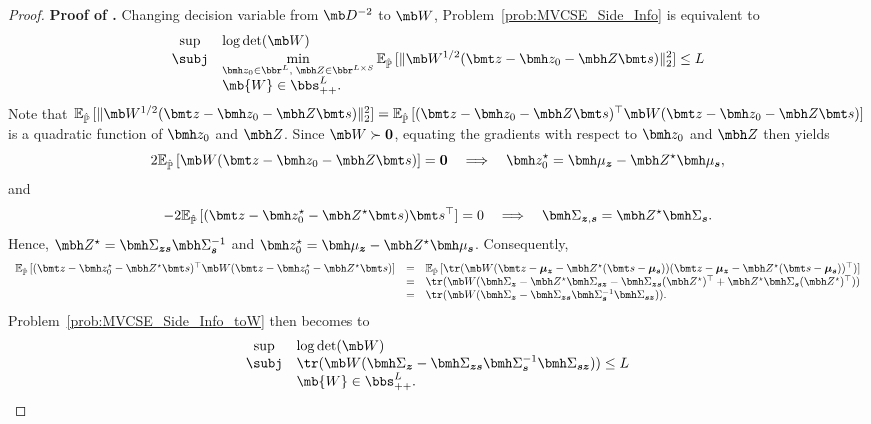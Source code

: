 \documentclass[mnsc, nonblindrev]{informswp}
\newcommand{\1}[1]{\mathds{1}{\left(#1\right)}}
\begin{document}
\begin{appendices}
\begin{proof}{\bf Proof of .}
Changing decision variable from $\mb D^{-2} $ to $\mb W$, Problem~\eqref{prob:MVCSE_Side_Info} is equivalent to
\begin{equation}
\label{prob:MVCSE_Side_Info_toW}
\begin{array}{cll}
\sup & \log\det(\mb W) \\
\subj & \displaystyle \min_{\bmh z_0\in \bbr^L, \; \mbh Z\in \bbr^{L \times S}} \mathbb{E}_{\hat{\mathbb{P}}}\,[\|\mb W^{1/2} ( \bmt z - \bmh z_0- \mbh Z\bmt s )\|_2^2] \leq L \\
& \mb{W} \in \bbs^{L}_{++}.  
\end{array} 
\end{equation}
Note that
$\mathbb{E}_{\hat{\mathbb{P}}}\,[\|\mb W^{1/2} ( \bmt z - \bmh z_0- \mbh Z\bmt s )\|_2^2] = \mathbb{E}_{\hat{\mathbb{P}}}\,[(\bmt z - \bmh z_0- \mbh Z\bmt s )^\top  \mb W (\bmt z - \bmh z_0- \mbh Z\bmt s)]$ is a quadratic function of $\bmh z_0$ and $\mbh Z$. Since $\mb W \succ \bm 0$, equating the gradients with respect to $\bmh z_0$ and $\mbh Z$ then yields
$$
2 \mathbb{E}_{\hat{\mathbb{P}}}\,[\mb W ( \bmt z - \bmh z_0- \mbh Z\bmt s )] = \bm 0 ~~~\Longrightarrow~~~
\bmh z_0^\star = \bmh \mu_{\bm z} - \mbh Z^\star \bmh \mu_{\bm s},
$$
and
$$
- 2 \mathbb{E}_{\hat{\mathbb{P}}}\,[(\bmt z - \bmh z_0^\star - \mbh Z^\star \bmt s) \bmt s^\top] = 0 
~~~\Longrightarrow~~~
\bmh \Sigma_{\bm z, \bm s} = \mbh Z^\star \bmh \Sigma_{\bm s}.
$$
Hence, $\mbh Z^\star = \bmh \Sigma_{\bm z \bm s} \mbh \Sigma_{\bm s}^{-1}$ and $\bmh z_0^\star = \bmh \mu_{\bm z} - \mbh Z^\star \bmh \mu_{\bm s}$. Consequently,
\[
\begin{array}{rcl}
\mathbb{E}_{\hat{\mathbb{P}}}\,[(\bmt z - \bmh z_0^\star - \mbh Z^\star \bmt s )^\top  \mb W ( \bmt z - \bmh z_0^\star - \mbh Z^\star \bmt s)] 
& = & \mathbb{E}_{\hat{\mathbb{P}}}\,[\tr(\mb W (\bmt z - \bm \mu_{\bm z} - \mbh Z^\star (\bmt s - \bm \mu_{\bm s}) ) (\bmt z - \bm \mu_{\bm z} - \mbh Z^\star (\bmt s - \bm \mu_{\bm s}) )^\top)] \\
& = & \tr(\mb W (\bmh \Sigma_{\bm z} - \mbh Z^\star \bmh \Sigma_{\bm s \bm z} - \bmh \Sigma_{\bm z \bm s} (\mbh Z^\star)^\top + \mbh Z^\star \bmh \Sigma_{\bm s} (\mbh Z^\star)^\top)) \\
& = & \tr(\mb W (\bmh \Sigma_{\bm z} - \bmh \Sigma_{\bm z \bm s} \bmh \Sigma_{\bm s}^{-1} \bmh \Sigma_{\bm s \bm z})).
\end{array}
\]
Problem~\eqref{prob:MVCSE_Side_Info_toW} then becomes to
\begin{equation}
\label{prob:MVCSE_Side_Info_toW2}
\begin{array}{cll}
\sup & \log\det(\mb W) \\
\subj & \displaystyle \tr(\mb W (\bmh \Sigma_{\bm z} - \bmh \Sigma_{\bm z \bm s} \bmh \Sigma_{\bm s}^{-1} \bmh \Sigma_{\bm s \bm z})) \leq L \\
&  \mb{W} \in \bbs^{L}_{++}.  
\end{array} 
\end{equation}


\end{proof}
\end{appendices}
\end{document}
